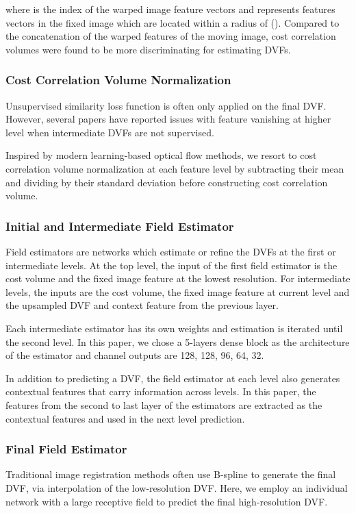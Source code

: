 \documentclass[runningheads]{llncs}
\begin{document}
\label{EQ-CC}
where  is the index of the warped image feature vectors and  represents features vectors in the fixed image which are located within a radius  of  (). 
Compared to the concatenation of the warped features of the moving image, cost correlation volumes were found to be more discriminating for estimating DVFs. 

\subsubsection{Cost Correlation Volume Normalization}
Unsupervised similarity loss function is often only applied on the final DVF. However, several papers \cite{jonschkowskiWhatMattersUnsupervised2020,sunPWCNetCNNsOptical2018} have reported issues with feature vanishing at higher level when intermediate DVFs are not supervised.

Inspired by modern learning-based optical flow methods, we resort to cost correlation volume normalization 
at each feature level by subtracting their mean and dividing by their standard deviation before constructing cost correlation volume.

\subsubsection{Initial and Intermediate Field Estimator}
Field estimators are networks which estimate or refine the DVFs at the first or intermediate levels. At the top level, the input of the first field estimator is the cost volume and the fixed image feature at the lowest resolution. For intermediate levels, the inputs are the cost volume, the fixed image feature at current level and the upsampled DVF and context feature from the previous layer.

Each intermediate estimator has its own weights and estimation is iterated until the second level. In this paper, we chose a 5-layers dense block as the architecture of the estimator and channel outputs are 128, 128, 96, 64, 32.  

In addition to predicting a DVF, the field estimator at each level also generates contextual features that carry information across levels. In this paper, the features from  the second to last layer of the estimators are extracted as the contextual features and  used in the next level prediction.

\subsubsection{Final Field Estimator}
Traditional image registration methods often use B-spline to generate the final DVF, via interpolation of the low-resolution DVF. 
Here, we employ an individual network with a large receptive field to predict the final high-resolution DVF. 
\end{document}
